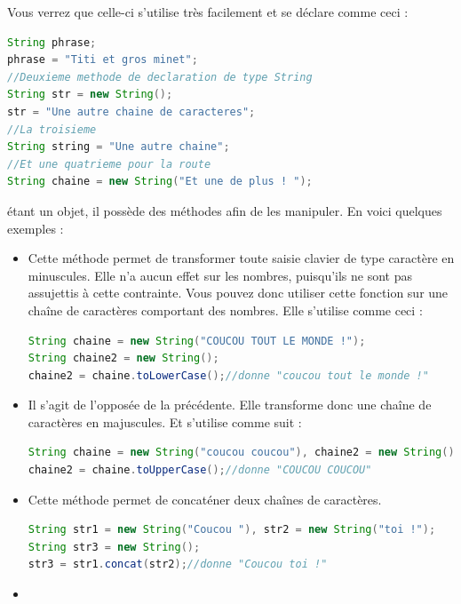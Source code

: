 \documentclass[a4paper,twoside]{article}
\begin{document}
Vous verrez que celle-ci s'utilise très facilement et se déclare comme ceci :
\begin{lstlisting}[language=java]
String phrase;
phrase = "Titi et gros minet";
//Deuxieme methode de declaration de type String
String str = new String();
str = "Une autre chaine de caracteres";
//La troisieme
String string = "Une autre chaine";
//Et une quatrieme pour la route
String chaine = new String("Et une de plus ! ");
\end{lstlisting}

\bigskip

 étant un objet, il possède des méthodes afin de les manipuler. En voici quelques exemples :
\begin{itemize}

\item {}

Cette méthode permet de transformer toute saisie clavier de type caractère en minuscules. Elle n'a aucun effet sur les nombres, puisqu'ils ne sont pas assujettis à cette contrainte. Vous pouvez donc utiliser cette fonction sur une chaîne de caractères comportant des nombres.
Elle s'utilise comme ceci :
\begin{lstlisting}[language=java]
String chaine = new String("COUCOU TOUT LE MONDE !");
String chaine2 = new String();
chaine2 = chaine.toLowerCase();//donne "coucou tout le monde !"
\end{lstlisting}


\item {}

Il s'agit de l'opposée de la précédente. Elle transforme donc une chaîne de caractères en majuscules. Et s'utilise comme suit :
\begin{lstlisting}[language=java]
String chaine = new String("coucou coucou"), chaine2 = new String();
chaine2 = chaine.toUpperCase();//donne "COUCOU COUCOU"
\end{lstlisting}


\item {}

Cette méthode permet de concaténer deux chaînes de caractères.
\begin{lstlisting}[language=java]
String str1 = new String("Coucou "), str2 = new String("toi !");
String str3 = new String();
str3 = str1.concat(str2);//donne "Coucou toi !"
\end{lstlisting}


\item {}


\end{itemize}
\end{document}
